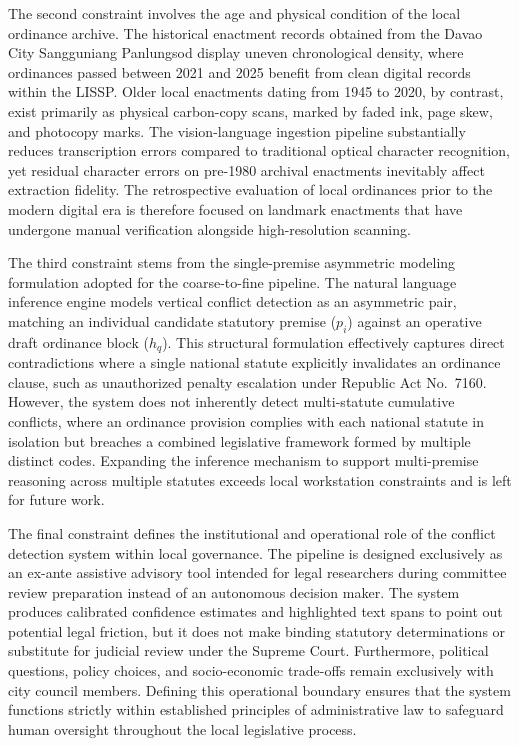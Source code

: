     The second constraint involves the age and physical condition of the local ordinance archive. The historical enactment records obtained from the Davao City Sangguniang Panlungsod display uneven chronological density, where ordinances passed between 2021 and 2025 benefit from clean digital records within the LISSP. Older local enactments dating from 1945 to 2020, by contrast, exist primarily as physical carbon-copy scans, marked by faded ink, page skew, and photocopy marks. The vision-language ingestion pipeline substantially reduces transcription errors compared to traditional optical character recognition, yet residual character errors on pre-1980 archival enactments inevitably affect extraction fidelity. The retrospective evaluation of local ordinances prior to the modern digital era is therefore focused on landmark enactments that have undergone manual verification alongside high-resolution scanning.

    The third constraint stems from the single-premise asymmetric modeling formulation adopted for the coarse-to-fine pipeline. The natural language inference engine models vertical conflict detection as an asymmetric pair, matching an individual candidate statutory premise ($p_i$) against an operative draft ordinance block ($h_q$). This structural formulation effectively captures direct contradictions where a single national statute explicitly invalidates an ordinance clause, such as unauthorized penalty escalation under Republic Act No.~7160. However, the system does not inherently detect multi-statute cumulative conflicts, where an ordinance provision complies with each national statute in isolation but breaches a combined legislative framework formed by multiple distinct codes. Expanding the inference mechanism to support multi-premise reasoning across multiple statutes exceeds local workstation constraints and is left for future work.

    The final constraint defines the institutional and operational role of the conflict detection system within local governance. The pipeline is designed exclusively as an ex-ante assistive advisory tool intended for legal researchers during committee review preparation instead of an autonomous decision maker. The system produces calibrated confidence estimates and highlighted text spans to point out potential legal friction, but it does not make binding statutory determinations or substitute for judicial review under the Supreme Court. Furthermore, political questions, policy choices, and socio-economic trade-offs remain exclusively with city council members. Defining this operational boundary ensures that the system functions strictly within established principles of administrative law to safeguard human oversight throughout the local legislative process.


    